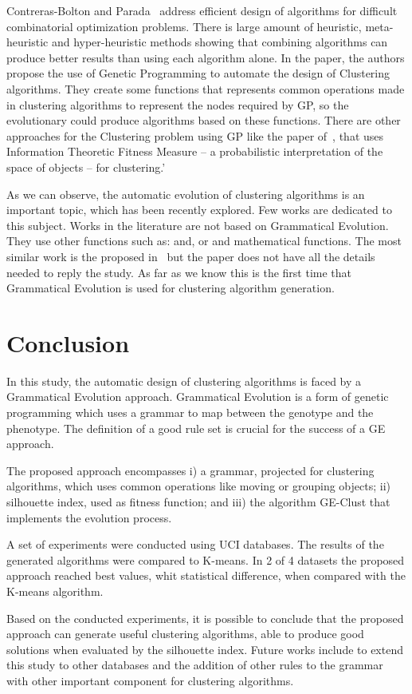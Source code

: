 \documentclass[conference]{IEEEtran}
\begin{document}
	Contreras-Bolton and Parada~\cite{bolton2015optimizing} address efficient design of algorithms for difficult combinatorial optimization problems. There is large amount of heuristic, meta-heuristic and hyper-heuristic methods showing that combining algorithms can produce better results than using each algorithm alone. In the paper, the authors propose the use of Genetic Programming to automate the design of Clustering algorithms. They create some functions that represents common operations made in clustering algorithms to represent the nodes required by GP, so the evolutionary could produce algorithms based on these functions. There are other approaches for the Clustering problem using GP like the paper of~\cite{boric2007genetic}, that uses Information Theoretic Fitness Measure -- a probabilistic interpretation of the space of objects -- for clustering.'
	
	As we can observe, the automatic evolution of clustering algorithms is an important topic, which has been recently explored. Few works are dedicated to this subject.   Works in the literature are not based on Grammatical Evolution. They use other functions such as:  and, or and mathematical functions. The most similar work is the proposed in~\cite{bolton2015optimizing} but the paper does not have all the details needed to reply the study.  As far as we know this is the first time that Grammatical Evolution is used for clustering algorithm generation. 
	
	
	\section{Conclusion}
	\label{sec:conclusion}
	
	
	In this study, the automatic design of clustering algorithms is faced by a Grammatical Evolution approach. Grammatical Evolution is a form of genetic programming which uses a grammar to map between the genotype and the phenotype. The definition of a good rule set is crucial for the success of a GE approach. 
	
	The proposed approach encompasses i) a grammar,  projected for clustering algorithms, which uses common operations like moving or grouping objects; ii)  silhouette index, used as fitness function; and iii) the algorithm GE-Clust that implements the evolution process. 
	
	A set of experiments were conducted using UCI databases. The results of the generated algorithms were compared to K-means. In 2 of 4 datasets the proposed approach reached best values, whit statistical difference, when compared with the K-means algorithm.
	
	Based on the conducted experiments, it is possible to conclude that the proposed approach can generate useful clustering algorithms, able to produce good solutions when evaluated by the silhouette index. Future works include to extend this study to other databases and the addition of other rules to the grammar with other important component for clustering algorithms.
	
	
	
	
	
\end{document}
